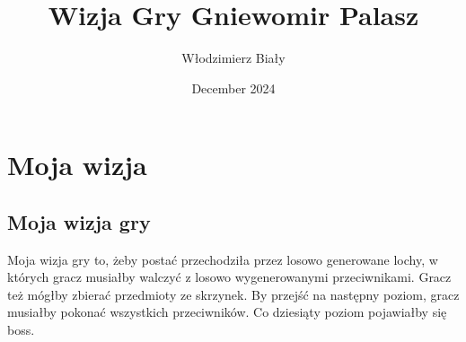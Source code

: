 \documentclass{article}
\title{Wizja Gry Gniewomir Palasz}
\author{Włodzimierz Biały}
\date{December 2024}
\begin{document}
\maketitle

\section{Moja wizja}
\subsection*{Moja wizja gry}
Moja wizja gry to, żeby postać przechodziła przez losowo generowane lochy, w których gracz musiałby walczyć z losowo wygenerowanymi przeciwnikami. Gracz też mógłby zbierać przedmioty ze skrzynek. By przejść na następny poziom, gracz musiałby pokonać wszystkich przeciwników. Co dziesiąty poziom pojawiałby się boss.
\end{document}
